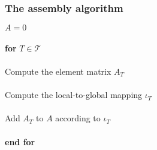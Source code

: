 \begin{frame}
  \frametitle{The assembly algorithm}

  \begin{tabbing}
    $A = 0$ \\
    \\
    \textbf{for} $T \in \mathcal{T}$ \\
    \\
    \tab Compute the element matrix $A_T$ \\
    \\
    \tab Compute the local-to-global mapping $\iota_T$ \\
    \\
    \tab Add $A_T$ to $A$ according to $\iota_T$ \\
    \\
    \textbf{end for}
  \end{tabbing}

\end{frame}
